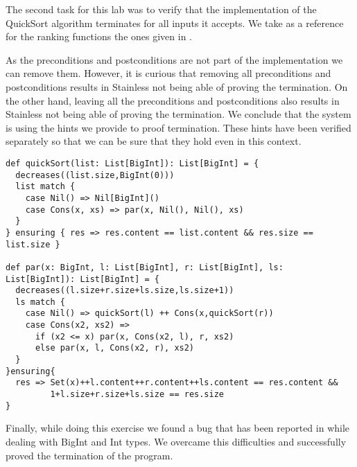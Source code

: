 \documentclass{article}
\begin{document}
The second task for this lab was to verify that the implementation of the QuickSort algorithm terminates for all inputs it accepts. We take as a reference for the ranking functions the ones given in  \cite{typearticle}. 

As the preconditions and postconditions are not part of the implementation we can remove them. However, it is curious that removing all preconditions and postconditions results in Stainless not being able of proving the termination. On the other hand, leaving all the preconditions and postconditions also results in Stainless not being able of proving the termination. We conclude that the system is using the hints we provide to proof termination. These hints have been verified separately so that we can be sure that they hold even in this context. 

\begin{lstlisting}[label={list:second},caption=Using decreases construct to proof termination]
def quickSort(list: List[BigInt]): List[BigInt] = {
  decreases((list.size,BigInt(0)))
  list match {
    case Nil() => Nil[BigInt]()
    case Cons(x, xs) => par(x, Nil(), Nil(), xs)
  }
} ensuring { res => res.content == list.content && res.size == list.size }
 
def par(x: BigInt, l: List[BigInt], r: List[BigInt], ls: List[BigInt]): List[BigInt] = {
  decreases((l.size+r.size+ls.size,ls.size+1))
  ls match {
    case Nil() => quickSort(l) ++ Cons(x,quickSort(r))
    case Cons(x2, xs2) => 
      if (x2 <= x) par(x, Cons(x2, l), r, xs2) 
      else par(x, l, Cons(x2, r), xs2)
  }
}ensuring{
  res => Set(x)++l.content++r.content++ls.content == res.content &&
         1+l.size+r.size+ls.size == res.size
}
\end{lstlisting}

Finally, while doing this exercise we found a bug that has been reported in \cite{bug} while dealing with BigInt and Int types. We overcame this difficulties and successfully proved the termination of the program.

\newpage

\printbibliography
\end{document}
